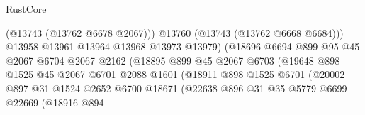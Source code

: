 \begin{lexlean}{RustCore}
\begin{coremodule}
                                            (@13743 (@13762 @6678 @2067)))
                                          @13760
                                          (@13743 (@13762 @6668 @6684)))
                                        @13958
                                        @13961
                                        @13964
                                        @13968
                                        @13973
                                        @13979)
                                      (@18696
                                        @6694
                                        @899
                                        @95
                                        @45
                                        @2067
                                        @6704
                                        @2067
                                        @2162
                                        (@18895
                                          @899
                                          @45
                                          @2067
                                          @6703
                                          (@19648
                                            @898
                                            @1525
                                            @45
                                            @2067
                                            @6701
                                            @2088
                                            @1601
                                            (@18911
                                              @898
                                              @1525
                                              @6701
                                              (@20002
                                                @897
                                                @31
                                                @1524
                                                @2652
                                                @6700
                                                @18671
                                                (@22638
                                                  @896
                                                  @31
                                                  @35
                                                  @5779
                                                  @6699
                                                  @22669
                                                  (@18916
                                                    @894

\end{coremodule}
\end{lexlean}
